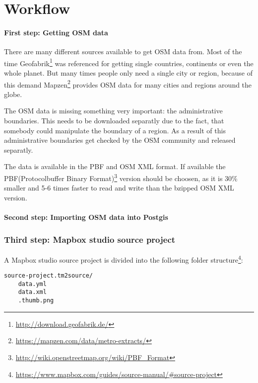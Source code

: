 \section{Workflow}\label{workflow}

\paragraph{First step: Getting OSM
data}\label{first-step-getting-osm-data}

There are many different sources available to get OSM data from. Most of
the time Geofabrik\footnote{\url{http://download.geofabrik.de/}} was
referenced for getting single countries, continents or even the whole
planet. But many times people only need a single city or region, because
of this demand
Mapzen\footnote{\url{https://mapzen.com/data/metro-extracts/}} provides
OSM data for many cities and regions around the globe.

The OSM data is missing something very important: the administrative
boundaries. This needs to be downloaded separatly due to the fact, that
somebody could manipulate the boundary of a region. As a result of this
administrative boundaries get checked by the OSM community and released
separatly.

The data is available in the PBF and OSM XML format. If available the
PBF(Protocolbuffer Binary
Format)\footnote{\url{http://wiki.openstreetmap.org/wiki/PBF_Format}}
version should be choosen, as it is 30\% smaller and 5-6 times faster to
read and write than the bzipped OSM XML version.

\paragraph{Second step: Importing OSM data into
Postgis}\label{second-step-importing-osm-data-into-postgis}


\subsubsection{Third step: Mapbox studio source
project}\label{third-step-mapbox-studio-source-project}

A Mapbox studio source project is divided into the following folder
structure\footnote{\url{https://www.mapbox.com/guides/source-manual/\#source-project}}:

\begin{verbatim}
source-project.tm2source/
    data.yml
    data.xml
    .thumb.png
\end{verbatim}

